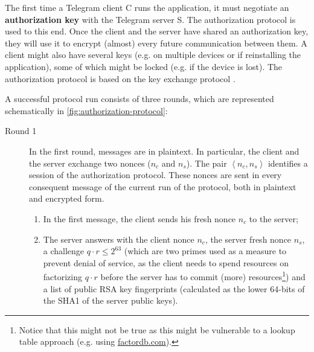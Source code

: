 The first time a Telegram client C runs the application, it must negotiate an \textbf{authorization key} with the Telegram server S. The authorization protocol is used to this end. Once the client and the server have shared an authorization key, they will use it to encrypt (almost) every future communication between them. A client might also have several keys (e.g. on multiple devices or if reinstalling the application), some of which might be locked (e.g. if the device is lost). The authorization protocol is based on the \DiHe{} key exchange protocol \cite{DH-protocol}.


A successful protocol run consists of three rounds, which are represented schematically in \cref{fig:authorization-protocol}:
\begin{description}
  \item[Round 1] In the first round, messages are in plaintext. In particular, the client and the server exchange two nonces ($n_c$ and $n_s$). The pair $\left<n_c, n_s\right>$ identifies a session of the authorization protocol. These nonces are sent in every consequent message of the current run of the protocol, both in plaintext and encrypted form.
    \begin{enumerate}
      \item{In the first message, the client sends his fresh nonce $n_c$ to the server;}
      \item{The server answers with the client nonce $n_c$, the server fresh nonce $n_s$, a challenge $q \cdot r \leq 2^{63}$ (which are two primes used as a measure to prevent denial of service, as the client needs to spend resources on factorizing $q \cdot r$ before the server has to commit (more) resources\footnote{Notice that this might not be true as this might be vulnerable to a lookup table approach (e.g. using \href{http://factordb.com}{factordb.com}).}) and a list of public RSA key fingerprints (calculated as the lower 64-bits of the SHA1 of the server public keys).}
    \end{enumerate}


\end{description}
